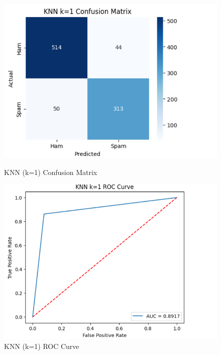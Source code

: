 \documentclass[12pt]{article}
\begin{document}
\begin{figure}[H]
\centering
\begin{minipage}{0.45\textwidth}
\centering
\includegraphics[width=\linewidth]{12.png}
\caption{KNN (k=1) Confusion Matrix}
\end{minipage}
\hfill
\begin{minipage}{0.45\textwidth}
\centering
\includegraphics[width=\linewidth]{13.png}
\caption{KNN (k=1) ROC Curve}
\end{minipage}
\end{figure}
\end{document}

